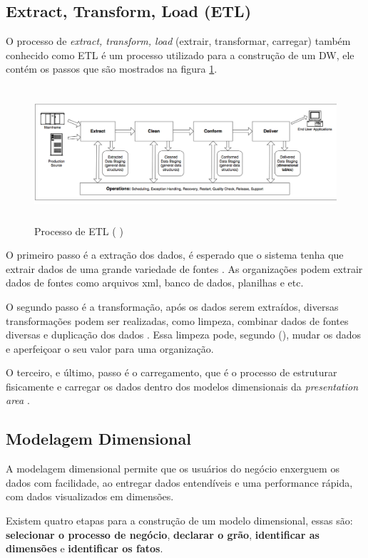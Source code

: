 \subsection{Extract, Transform, Load (ETL)}
O processo de \textit{extract, transform, load} (extrair, transformar, carregar) também conhecido como ETL é um processo utilizado para a construção de um DW, ele contém os passos que são mostrados na figura \ref{etl}. 
\begin{figure}[H]
\centering
\includegraphics[height=5cm]{imagens/dw_process.png}
\caption{Processo de ETL (\citeauthor{kimball2004} \citeyear{kimball2004})}
\label{etl}
\end{figure}
O primeiro passo é a extração dos dados, é esperado que o sistema tenha que extrair dados de uma grande variedade de fontes \citep{kimball2013}. As organizações podem extrair dados de fontes como arquivos xml, banco de dados, planilhas e etc.

O segundo passo é a transformação, após os dados serem extraídos, diversas transformações podem ser realizadas, como limpeza, combinar dados de fontes diversas e duplicação dos dados \citep{kimball2013}. Essa limpeza pode, segundo \citeauthor{kimball2013} (\citeyear{kimball2013}), mudar os dados e aperfeiçoar o seu valor para uma organização.

O terceiro, e último, passo é o carregamento, que é o processo de estruturar fisicamente e carregar os dados dentro dos modelos dimensionais da \textit{presentation area} \citep{kimball2013}.

\subsection{Modelagem Dimensional}
A modelagem dimensional permite que os usuários do negócio enxerguem os dados com facilidade, ao entregar dados entendíveis e uma performance rápida, com dados visualizados em dimensões.

Existem quatro etapas para a construção de um modelo dimensional, essas são: \textbf{selecionar o processo de negócio}, \textbf{declarar o grão}, \textbf{identificar as dimensões} e \textbf{identificar os fatos}. 

